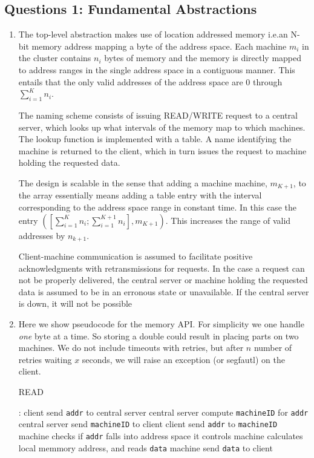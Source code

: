 \documentclass[11pt,a4paper,english]{article}
\begin{document}
\subsection{Questions 1: Fundamental Abstractions}
\begin{enumerate}
\item

  The top-level abstraction makes use of location addressed memory i.e.\@ an N-bit
  memory address mapping a byte of the address space. Each machine $m_i$
  in the cluster contains $n_i$
  bytes of memory and the memory is directly mapped to address ranges in the
  single address space in a contiguous manner. This entails that the only valid
  addresses of the address space are 0 through $\sum_{i=1}^{K} n_{i}$.

The naming scheme consists of issuing READ/WRITE request to a central server,
which looks up what intervals of the memory map to which machines. The lookup
function is implemented with a table. A name identifying the machine is returned
to the client, which in turn issues the request to machine holding the requested
data.

The design is scalable in the sense that adding a machine machine, $m_{K+1}$,
to the array essentially means adding a table entry with the interval
corresponding to the address space range in constant time. In this case the
entry $([\sum_{i=1}^{K} n_{i}; \sum_{i=1}^{K+1} n_{i}], m_{K+1})$.
This increases the range of valid addresses by $n_{k+1}$.

Client-machine communication is assumed to facilitate positive acknowledgments
with retransmissions for requests. In the case a request can not be properly
delivered, the central server or machine holding the requested data is assumed
to be in an erronous state or unavailable. If the central server is down, it
will not be possible

\item Here we show pseudocode for the memory API. For simplicity we one handle
  \emph{one} byte at a time. So storing a double could result in placing parts on
  two machines. We do not include timeouts with retries, but after $n$ number of
  retries waiting $x$ seconds, we will raise an exception (or segfautl) on the client.

\begin{algorithm}[H]
\caption{READ}
\begin{algorithmic}[1]
:
\State client send \texttt{addr} to central server
\State central server compute \texttt{machineID} for \texttt{addr}
\State central server send \texttt{machineID} to client
\smallskip
\State client send \texttt{addr} to \texttt{machineID}
\State machine checks if \texttt{addr} falls into address space it controls
\State machine calculates local memmory address, and reads \texttt{data}
\State machine send \texttt{data} to client
\EndProcedure
\end{algorithmic}
\end{algorithm}


\end{enumerate}
\end{document}
